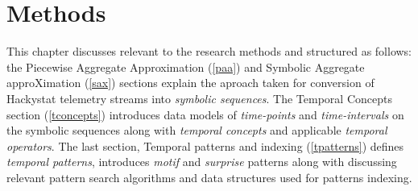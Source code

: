 \chapter{Methods}
This chapter discusses relevant to the research methods and structured as follows: the Piecewise Aggregate Approximation (\ref{paa}) and Symbolic Aggregate approXimation (\ref{sax}) sections explain the aproach taken for conversion of Hackystat telemetry streams into \textit{symbolic sequences}.  
The Temporal Concepts section (\ref{tconcepts}) introduces data models of \textit{time-points} and \textit{time-intervals} on the symbolic sequences along with \textit{temporal concepts} and applicable \textit{temporal operators}. The last section, Temporal patterns  and indexing (\ref{tpatterns}) defines \textit{temporal patterns}, introduces \textit{motif} and \textit{surprise} patterns along with discussing relevant pattern search algorithms and data structures used for patterns indexing.